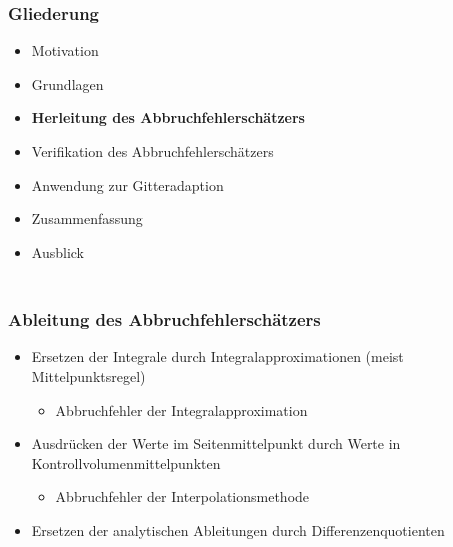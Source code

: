 \documentclass[accentcolor=tud2c,colorbacktitle,inverttitle,landscape,ngerman,presentation,t]{tudbeamer}
\begin{document}
\begin{frame}
  \frametitle{\\Gliederung}
  \begin{itemize}
  \item Motivation
  \item Grundlagen
  \item \textbf{Herleitung des Abbruchfehlerschätzers}
  \item Verifikation des Abbruchfehlerschätzers
  \item Anwendung zur Gitteradaption
  \item Zusammenfassung
  \item Ausblick
  \end{itemize}
\end{frame}








\begin{frame}
  \frametitle{\\Ableitung des Abbruchfehlerschätzers}
    \begin{itemize}
      \item Ersetzen der Integrale durch Integralapproximationen
        (meist Mittelpunktsregel)
        \begin{itemize}
          \item Abbruchfehler der Integralapproximation
        \end{itemize}
      \item Ausdrücken der Werte im Seitenmittelpunkt durch
        Werte in Kontrollvolumenmittelpunkten
        \begin{itemize}
          \item Abbruchfehler der Interpolationsmethode
        \end{itemize}
      \item Ersetzen der analytischen Ableitungen durch Differenzenquotienten
    \end{itemize}
    \vspace{10pt}
    \begin{figure}[b]

\centering
\end{figure}
\end{frame}
\end{document}
